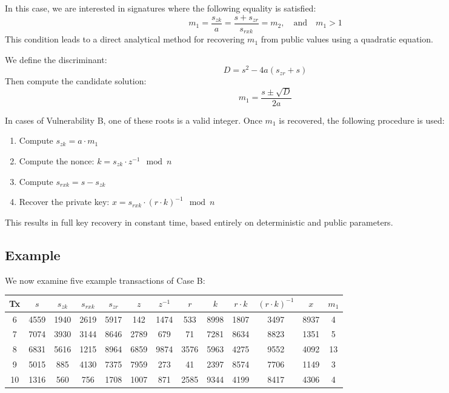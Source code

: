 \documentclass[11pt]{article}
\begin{document}
In this case, we are interested in signatures where the following equality is satisfied:
\[
m_1 = \frac{s_{zk}}{a} = \frac{s + s_{zr}}{s_{rxk}} = m_2,\quad \text{and} \quad m_1 > 1
\]
This condition leads to a direct analytical method for recovering $m_1$ from public values using a quadratic equation.

We define the discriminant:
\[
D = s^2 - 4a(s_{zr} + s)
\]
Then compute the candidate solution:
\[
m_1 = \frac{s \pm \sqrt{D}}{2a}
\]

In cases of Vulnerability B, one of these roots is a valid integer. Once $m_1$ is recovered, the following procedure is used:

\begin{enumerate}
    \item Compute $s_{zk} = a \cdot m_1$
    \item Compute the nonce: $k = s_{zk} \cdot z^{-1} \mod n$
    \item Compute $s_{rxk} = s - s_{zk}$
    \item Recover the private key: $x = s_{rxk} \cdot (r \cdot k)^{-1} \mod n$
\end{enumerate}

This results in full key recovery in constant time, based entirely on deterministic and public parameters.

\subsection{Example}
We now examine five example transactions of Case B:

\begin{center}
\small
\begin{tabular}{|c|c|c|c|c|c|c|c|c|c|c|c|c|}
\hline
Tx & $s$ & $s_{zk}$ & $s_{rxk}$ & $s_{zr}$ & $z$ & $z^{-1}$ & $r$ & $k$ & $r \cdot k$ & $(r \cdot k)^{-1}$ & $x$ & $m_1$ \\
\hline
6 & 4559 & 1940 & 2619 & 5917 & 142 & 1474 & 533 & 8998 & 1807 & 3497  & 8937 & 4 \\
7 & 7074 & 3930 & 3144 & 8646 & 2789 & 679 & 71 & 7281 & 8634 & 8823 & 1351 & 5 \\
8 & 6831 & 5616 & 1215 & 8964 & 6859 & 9874 & 3576 & 5963 & 4275 & 9552 & 4092 & 13 \\
9 & 5015 & 885 & 4130 & 7375 & 7959 & 273 & 41 & 2397 & 8574 & 7706 & 1149 & 3 \\
10 & 1316 & 560 & 756 & 1708 & 1007 & 871 & 2585 & 9344 & 4199 & 8417 & 4306 & 4 \\
\hline
\end{tabular}
\end{center}
\end{document}
